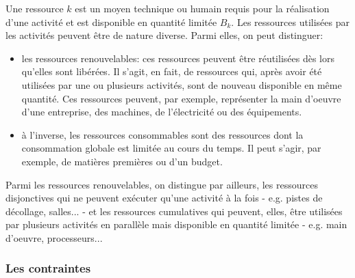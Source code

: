 Une ressource $k$ est un moyen technique ou humain requis pour la
réalisation d'une activité et est disponible en quantité limitée $B_k$. 
Les ressources utilisées par les activités peuvent être de nature
diverse. Parmi elles, on peut distinguer: 
\begin{itemize}
\item les ressources renouvelables: ces ressources peuvent être
réutilisées dès lors qu'elles sont libérées. Il s'agit, en fait, de
ressources qui, après avoir été utilisées par une ou plusieurs
activités, sont de nouveau disponible en même quantité. Ces ressources
peuvent, par exemple, représenter la main d'oeuvre d'une entreprise,
des machines, de l'électricité ou des équipements.
\item à l'inverse, les ressources consommables sont des ressources
dont la consommation globale est limitée au cours du temps. Il peut
s'agir, par exemple, de matières premières ou d'un budget.
\end{itemize}

Parmi les ressources renouvelables, on distingue par ailleurs, les
ressources disjonctives qui ne peuvent exécuter qu'une activité à la
fois - e.g. pistes de décollage, salles... - et les ressources cumulatives
qui peuvent, elles,  être utilisées par plusieurs activités en
parallèle mais disponible en quantité limitée - e.g. main d'oeuvre,
processeurs...

\subsubsection{Les contraintes}


